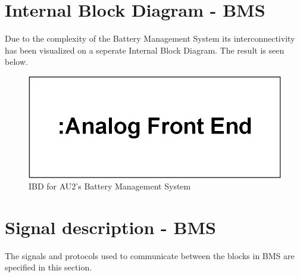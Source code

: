 \section{Internal Block Diagram - BMS}
Due to the complexity of the Battery Management System its interconnectivity has been visualized on a seperate Internal Block Diagram. The result is seen below.
\begin{figure}[H]
	\centering
	\includegraphics[width=1\linewidth]{Architecture/Diagrams/IBD_BMS}
	\caption{IBD for AU2's Battery Management System}
	\label{fig:IBD_BMS}
\end{figure}

\section{Signal description - BMS}
The signals and protocols used to communicate between the blocks in BMS are specified in this section.


